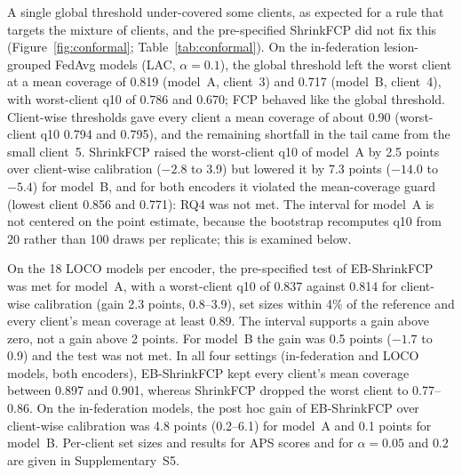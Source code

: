 \documentclass[VANCOUVER,Times1COL]{WileyNJDv5}
\begin{document}
A single global threshold under-covered some clients, as expected for a rule that targets the mixture of
clients, and the pre-specified ShrinkFCP did not fix this (Figure~\ref{fig:conformal};
Table~\ref{tab:conformal}). On the in-federation lesion-grouped FedAvg models (LAC, $\alpha=0.1$), the
global threshold left the worst client at a mean coverage of 0.819 (model~A, client~3) and 0.717 (model~B,
client~4), with worst-client q10 of 0.786 and 0.670; FCP behaved like the global threshold. Client-wise
thresholds gave every client a mean coverage of about 0.90 (worst-client q10 0.794 and 0.795), and the
remaining shortfall in the tail came from the small client~5. ShrinkFCP raised the worst-client q10 of
model~A by 2.5 points over client-wise calibration ($-2.8$ to 3.9) but lowered it by 7.3 points ($-14.0$ to
$-5.4$) for model~B, and for both encoders it violated the mean-coverage guard (lowest client 0.856 and
0.771): RQ4 was not met. The interval for model~A is not centered on the point estimate, because the
bootstrap recomputes q10 from 20 rather than 100 draws per replicate; this is examined below.

On the 18 LOCO models per encoder, the pre-specified test of EB-ShrinkFCP was met for model~A, with a
worst-client q10 of 0.837 against 0.814 for client-wise calibration (gain 2.3 points, 0.8--3.9), set sizes
within 4\% of the reference and every client's mean coverage at least 0.89. The interval supports a gain
above zero, not a gain above 2 points. For model~B the gain was 0.5 points ($-1.7$ to 0.9) and the test was
not met. In all four settings (in-federation and LOCO models, both encoders), EB-ShrinkFCP kept every
client's mean coverage between 0.897 and 0.901, whereas ShrinkFCP dropped the worst client to 0.77--0.86.
On the in-federation models, the post hoc gain of EB-ShrinkFCP over client-wise calibration was 4.8 points
(0.2--6.1) for model~A and 0.1 points for model~B. Per-client set sizes and results for APS scores and for
$\alpha=0.05$ and $0.2$ are given in Supplementary~S5.
\end{document}
